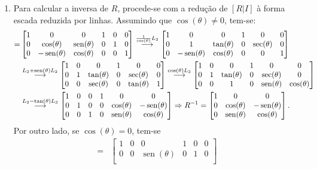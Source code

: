 \documentclass[12pt,a4paper]{article}
\newcommand*\sen{\operatorname{sen}}
\newcommand{\grstep}[2][\relax]{%
   \ensuremath{\mathrel{
       {\mathop{\longrightarrow}\limits^{#2\mathstrut}_{
                                     \begin{subarray}{l} #1 \end{subarray}}}}}}
\begin{document}
\begin{enumerate}
\item Para calcular a inversa de $R$, procede-se com a redução de $[R|I]$ à forma escada reduzida por linhas. Assumindo que $\cos(\theta) \neq 0$, tem-se:
\begin{align*}
[R|I] = &
\begin{bmatrix}
1 & 0 & 0 & 1 & 0 & 0 \\
0 & \cos(\theta) & \sen(\theta) & 0 & 1 & 0 \\
0 & -\sen(\theta) & \cos(\theta) & 0 & 0 & 1
\end{bmatrix}
\grstep{ \frac{1}{\cos(\theta)} L_2 }
\begin{bmatrix}
1 & 0 & 0 & 1 & 0 & 0 \\
0 & 1 & \tan(\theta) & 0 & \sec(\theta) & 0 \\
0 & -\sen(\theta) & \cos(\theta) & 0 & 0 & 1
\end{bmatrix} \\
&
\grstep{ L_3 + \sen(\theta) L_2 }
\begin{bmatrix}
1 & 0 & 0 & 1 & 0 & 0 \\
0 & 1 & \tan(\theta) & 0 & \sec(\theta) & 0 \\
0 & 0 & \sec(\theta) & 0 & \tan(\theta) & 1
\end{bmatrix}
\grstep{ \cos(\theta) L_3 }
\begin{bmatrix}
1 & 0 & 0  & 1 & 0 & 0 \\
0 & 1 & \tan(\theta) & 0 & \sec(\theta) & 0 \\
0 & 0 & 1 & 0 & \sen(\theta) & \cos(\theta)
\end{bmatrix}\\
&
\grstep{ L_2 - \tan(\theta) L_3 }
\begin{bmatrix}
1 & 0 & 0 & 1 & 0 & 0 \\
0 & 1 & 0 & 0 & \cos(\theta) & -\sen(\theta) \\
0 & 0 & 1 & 0 & \sen(\theta) & \cos(\theta)
\end{bmatrix}
\Rightarrow
R^{-1} =
\begin{bmatrix}
1 & 0 & 0 \\
0 & \cos(\theta) & -\sen(\theta) \\
0 & \sen(\theta) & \cos(\theta)
\end{bmatrix}.
\end{align*}
Por outro lado, se $\cos(\theta) = 0$, tem-se
\begin{align*}
[R|I] = &
\begin{bmatrix}
1 & 0 & 0 & 1 & 0 & 0 \\
0 & 0 & \sen(\theta) & 0 & 1 & 0 \\

\end{bmatrix}
\end{align*}
\end{enumerate}
\end{document}
